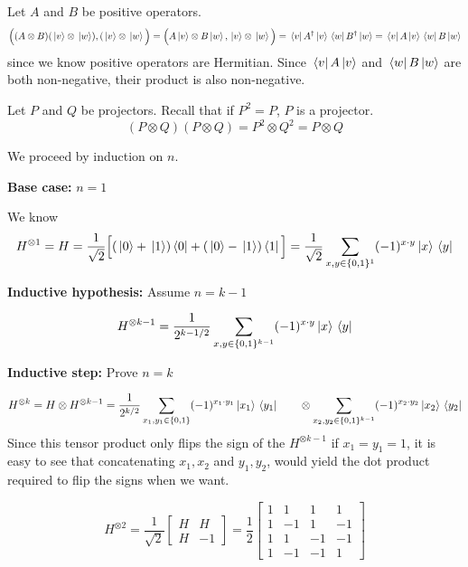 \exercise
Let $A$ and $B$ be positive operators. 
$$\Big( (A \otimes B)(\ket*{v} \otimes \ket*{w}), (\ket*{v} \otimes \ket*{w} \Big) = \Big( A \ket*{v} \otimes B \ket*{w}, \ket*{v} \otimes \ket*{w} \Big) = \bra*{v} A^{\dagger} \ket*{v} \bra*{w} B^{\dagger} \ket*{w} = \bra*{v} A \ket*{v} \bra*{w} B \ket*{w}$$
since we know positive operators are Hermitian. Since $\bra*{v} A \ket*{v}$ and $\bra*{w} B \ket*{w}$ are both non-negative, their product is also non-negative. 

\exercise
Let $P$ and $Q$ be projectors. Recall that if $P^{2} = P$, $P$ is a projector. 
$$(P \otimes Q)(P \otimes Q) = P^{2} \otimes Q^{2} = P \otimes Q$$

\exercise
We proceed by induction on $n$. 

\textbf{Base case: } $n = 1$

We know $$H^{\otimes 1} = H = \frac{1}{\sqrt{2}} \Big[ (\ket*{0} + \ket*{1})\bra*{0} +  (\ket*{0} - \ket*{1})\bra*{1} \Big] = \frac{1}{\sqrt{2}} \sum_{x, y \in \{ 0, 1 \}^{1}} (-1)^{x \cdot y} \ket*{x} \bra*{y}$$

\textbf{Inductive hypothesis: } Assume $n = k - 1$

$$H^{\otimes k - 1} = \frac{1}{2^{k - 1 / 2}} \sum_{x, y \in \{0, 1\}^{k-1}} (-1)^{x \cdot y} \ket*{x} \bra*{y}$$

\textbf{Inductive step: } Prove $n = k$

$$H^{\otimes k} = H \otimes H^{\otimes k - 1} = \frac{1}{2^{k / 2}} \sum_{x_{1}, y_{1} \in \{0, 1\}} (-1)^{x_{1} \cdot y_{1}} \ket*{x_{1}} \bra*{y_{1}} \qquad \otimes \sum_{x_{2}, y_{2} \in \{ 0, 1\}^{k-1}} (-1)^{x_{2} \cdot y_{2}} \ket*{x_{2}} \bra*{y_{2}}$$
Since this tensor product only flips the sign of the $H^{\otimes k - 1}$ if $x_{1} = y_{1} = 1$, it is easy to see that concatenating $x_{1}, x_{2}$ and $y_{1}, y_{2}$, would yield the dot product required to flip the signs when we want. 

$$H^{\otimes 2} = \frac{1}{\sqrt{2}} \begin{bmatrix}
H & H \\
H & -1
\end{bmatrix} = \frac{1}{2} \begin{bmatrix}
1 & 1 & 1 & 1 \\
1 & -1 & 1 & -1 \\
1 & 1 & -1 & -1 \\
1 & -1 & -1 & 1
\end{bmatrix}$$